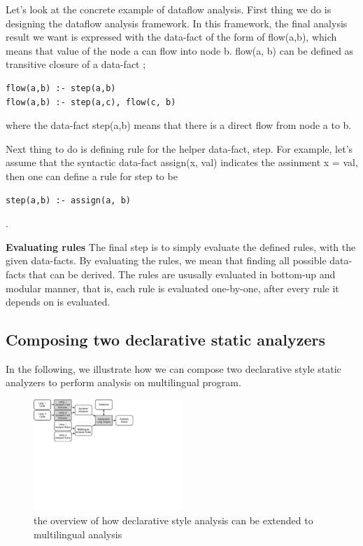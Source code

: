 Let's look at the concrete example of dataflow analysis. First thing we do is
designing the dataflow analysis framework.  In this framework, the final
analysis result we want is expressed with the data-fact of the form of
flow(a,b), which means that value of the node a can flow into node b. flow(a,
b) can be defined as transitive closure of a data-fact ;

\begin{lstlisting}[style=myDatalog,xleftmargin=2.5em]
flow(a,b) :- step(a,b)
flow(a,b) :- step(a,c), flow(c, b)
\end{lstlisting}
where the data-fact step(a,b) means that there is a direct flow from node a to b.

Next thing to do is defining rule for the helper data-fact, step.  For example,
let's assume that the syntactic data-fact assign(x, val) indicates the assinment
x = val, then one can define a rule for step to be
\begin{lstlisting}[style=myDatalog,xleftmargin=2.5em]
step(a,b) :- assign(a, b)
\end{lstlisting}
.


\textbf{Evaluating rules}
The final step is to simply evaluate the defined rules, with the given
data-facts.  By evaluating the rules, we mean that finding all possible
data-facts that can be derived. The rules are ususally evaluated in bottom-up
and modular manner, that is, each rule is evaluated one-by-one, after every
rule it depends on is evaluated.

\subsection{Composing two declarative static analyzers}

In the following, we illustrate how we can compose two declarative style static analyzers
to perform analysis on multilingual program.

\begin{figure}[t]
  \centering
  \vspace{2mm}
  \includegraphics[width=0.5\textwidth]{img/overview2}
  \vspace*{-1.5em}
  \caption{the overview of how declarative style analysis can be
  extended to multilingual analysis}
  \label{fig:overview2}
\vspace*{-.5em}
\end{figure}


